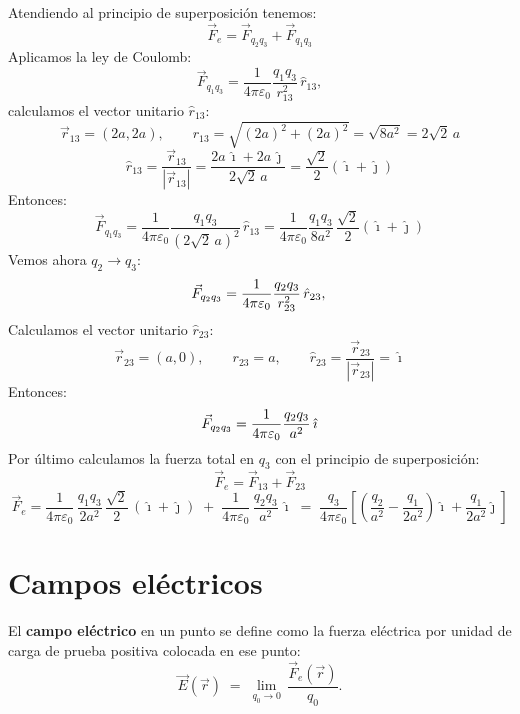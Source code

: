 \documentclass[a4paper,12pt]{article}
\begin{document}
\medskip
\noindent
Atendiendo al principio de superposición tenemos:
\[
\vec{F}_e = \vec{F}_{q_2 q_3} + \vec{F}_{q_1 q_3}
\]
Aplicamos la ley de Coulomb:
\[
\vec{F}_{q_1 q_3} = \frac{1}{4\pi \varepsilon_0} \frac{q_1 q_3}{r_{13}^2} \, \hat{r}_{13}, 
\]
calculamos el vector unitario $\hat{r}_{13}$:
\[
\vec{r}_{13} = (2a,2a), 
\qquad r_{13} = \sqrt{(2a)^2+(2a)^2} = \sqrt{8a^2} = 2\sqrt{2}\,a
\]
\[
\hat{r}_{13} = \frac{\vec{r}_{13}}{|\vec{r}_{13}|} = \frac{2a\,\hat{\imath} + 2a\,\hat{\jmath}}{2\sqrt{2}\,a} 
= \frac{\sqrt{2}}{2} (\hat{\imath} + \hat{\jmath})
\]
Entonces:\\
\[
\vec{F}_{q_1 q_3} = \frac{1}{4\pi \varepsilon_0} \frac{q_1 q_3}{(2\sqrt{2}\,a)^2} \, \hat{r}_{13}
= \frac{1}{4\pi \varepsilon_0} \frac{q_1 q_3}{8a^2} \, \frac{\sqrt{2}}{2} (\hat{\imath} + \hat{\jmath})
\]
Vemos ahora $q_2 \to q_3$:\\
\[
\vec{F}_{q_2 q_3} = \frac{1}{4\pi \varepsilon_0} \frac{q_2 q_3}{r_{23}^2} \, \hat{r}_{23}, \\
\]
Calculamos el vector unitario $\hat{r}_{23}$:
\[
\vec{r}_{23} = (a,0), \qquad r_{23}=a, \qquad \hat{r}_{23} = \frac{\vec{r}_{23}}{|\vec{r}_{23}|} = \hat{\imath}
\]
Entonces:
\[
\vec{F}_{q_2 q_3} = \frac{1}{4\pi \varepsilon_0} \frac{q_2 q_3}{a^2} \, \hat{\imath}\\
\]
Por último calculamos la fuerza total en $q_3$ con el principio de superposición:
\[
\vec{F}_e = \vec{F}_{13} + \vec{F}_{23}
\]
\[
\vec{F}_e =
\frac{1}{4\pi\varepsilon_0}\,\frac{q_1 q_3}{2a^2}\,\frac{\sqrt{2}}{2}\,(\hat{\imath}+\hat{\jmath})
\;+\;
\frac{1}{4\pi\varepsilon_0}\,\frac{q_2 q_3}{a^2}\,\hat{\imath}
\;=\;
\frac{q_3}{4\pi\varepsilon_0}\!\left[
\left(\frac{q_2}{a^2}-\frac{q_1}{2a^2}\right)\hat{\imath}
+\frac{q_1}{2a^2}\hat{\jmath}
\right]
\]

\newpage

\section{Campos eléctricos}
\noindent
El \textbf{campo eléctrico} en un punto se define como la fuerza eléctrica por unidad de carga de prueba positiva colocada en ese punto:
\[
\vec E(\vec r) \;=\; \lim_{q_0 \to 0}\,\frac{\vec F_e(\vec r)}{q_0}.
\]
\end{document}
